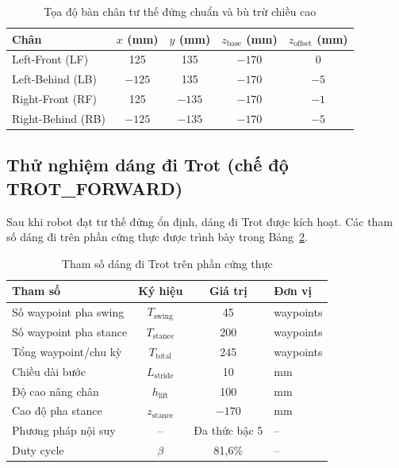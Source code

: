 \begin{table}[H]
\centering
\caption{Tọa độ bàn chân tư thế đứng chuẩn và bù trừ chiều cao}
\label{tab:homing_targets}
\renewcommand{\arraystretch}{1.3}
\begin{tabular}{|l|c|c|c|c|}
\hline
\textbf{Chân} & $x$ (mm) & $y$ (mm) & $z_{\text{base}}$ (mm) & $z_{\text{offset}}$ (mm) \\ \hline
Left-Front (LF) & 125 & 135 & $-170$ & 0 \\ \hline
Left-Behind (LB) & $-125$ & 135 & $-170$ & $-5$ \\ \hline
Right-Front (RF) & 125 & $-135$ & $-170$ & $-1$ \\ \hline
Right-Behind (RB) & $-125$ & $-135$ & $-170$ & $-5$ \\ \hline
\end{tabular}
\end{table}

\subsection{Thử nghiệm dáng đi Trot (chế độ TROT\_FORWARD)}

Sau khi robot đạt tư thế đứng ổn định, dáng đi Trot được kích hoạt. Các tham số dáng đi trên phần cứng thực được trình bày trong Bảng~\ref{tab:hw_gait_params}.

\begin{table}[H]
\centering
\caption{Tham số dáng đi Trot trên phần cứng thực}
\label{tab:hw_gait_params}
\renewcommand{\arraystretch}{1.3}
\begin{tabular}{|l|c|c|l|}
\hline
\textbf{Tham số} & \textbf{Ký hiệu} & \textbf{Giá trị} & \textbf{Đơn vị} \\ \hline
Số waypoint pha swing & $T_{\text{swing}}$ & 45 & waypoints \\ \hline
Số waypoint pha stance & $T_{\text{stance}}$ & 200 & waypoints \\ \hline
Tổng waypoint/chu kỳ & $T_{\text{total}}$ & 245 & waypoints \\ \hline
Chiều dài bước & $L_{\text{stride}}$ & 10 & mm \\ \hline
Độ cao nâng chân & $h_{\text{lift}}$ & 100 & mm \\ \hline
Cao độ pha stance & $z_{\text{stance}}$ & $-170$ & mm \\ \hline
Phương pháp nội suy & -- & Đa thức bậc 5 & -- \\ \hline
Duty cycle & $\beta$ & 81,6\% & -- \\ \hline
\end{tabular}
\end{table}

